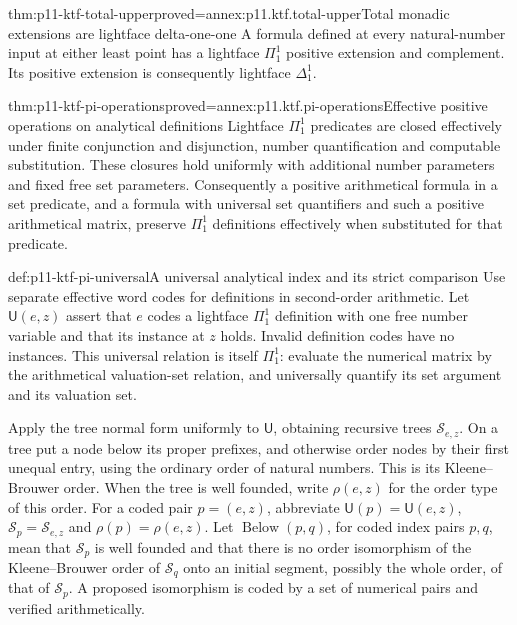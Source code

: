 \begin{hbcorollary}{thm:p11-ktf-total-upper}{proved=annex:p11.ktf.total-upper}{Total monadic extensions are lightface delta-one-one}
A formula defined at every natural-number input at either least point has
a lightface \(\Pi^1_1\) positive extension and complement. Its positive
extension is consequently lightface \(\Delta^1_1\).
\end{hbcorollary}

\begin{hblemma}{thm:p11-ktf-pi-operations}{proved=annex:p11.ktf.pi-operations}{Effective positive operations on analytical definitions}
Lightface \(\Pi^1_1\) predicates are closed effectively under finite
conjunction and disjunction, number quantification and computable
substitution. These closures hold uniformly with additional number
parameters and fixed free set parameters. Consequently a positive
arithmetical formula in a set predicate, and a formula with universal
set quantifiers and such a positive arithmetical matrix, preserve
\(\Pi^1_1\) definitions effectively when substituted for that predicate.
\end{hblemma}

\begin{hbdefinition}{def:p11-ktf-pi-universal}{A universal analytical index and its strict comparison}
Use separate effective word codes for definitions in second-order
arithmetic. Let \(\mathsf U(e,z)\) assert that \(e\) codes a
lightface \(\Pi^1_1\) definition with one free number variable and
that its instance at \(z\) holds. Invalid definition codes have no
instances. This universal relation is itself \(\Pi^1_1\): evaluate
the numerical matrix by the arithmetical valuation-set relation, and
universally quantify its set argument and its valuation set.

Apply the tree normal form uniformly to \(\mathsf U\), obtaining
recursive trees \(\mathcal S_{e,z}\). On a tree put a node below
its proper prefixes, and otherwise order nodes by their first unequal
entry, using the ordinary order of natural numbers. This is its
Kleene--Brouwer order. When the tree is well founded, write
\(\rho(e,z)\) for the order type of this order.
For a coded pair \(p=(e,z)\), abbreviate
\(\mathsf U(p)=\mathsf U(e,z)\),
\(\mathcal S_p=\mathcal S_{e,z}\) and \(\rho(p)=\rho(e,z)\).
Let \(\operatorname{Below}(p,q)\), for coded index pairs \(p,q\),
mean that \(\mathcal S_p\) is well founded and that there is no
order isomorphism of the Kleene--Brouwer order of \(\mathcal S_q\)
onto an initial segment, possibly the whole order, of that of
\(\mathcal S_p\). A proposed isomorphism is coded by a set of
numerical pairs and verified arithmetically.
\end{hbdefinition}

